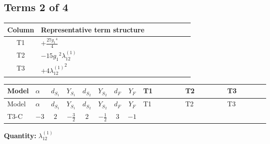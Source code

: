 \documentclass[8pt]{article}
\begin{document}
\begin{landscape}
\subsection*{Terms 2 of 4}
\begin{center}
\begin{tabular}{@{}c >{\raggedright\arraybackslash}p{0.82\linewidth}@{}}
\toprule
Column & Representative term structure \\
\midrule
T1 & \(\displaystyle +\frac{27 {g_1}^4}{4}\) \\
\midrule
T2 & \(\displaystyle -15 {g_1}^2 {\lambda_{12}^{(1)}}\) \\
\midrule
T3 & \(\displaystyle +4 {\lambda_{12}^{(1)}}^2\) \\
\midrule
\bottomrule
\end{tabular}
\end{center}
\smallskip
\tiny
\begin{longtable}{@{}llcccccc >{\raggedright\arraybackslash}p{0.21\linewidth} >{\raggedright\arraybackslash}p{0.21\linewidth} >{\raggedright\arraybackslash}p{0.21\linewidth}@{}}
\toprule
Model & $\alpha$ & $d_{S_1}$ & $Y_{S_1}$ & $d_{S_2}$ & $Y_{S_2}$ & $d_F$ & $Y_F$ & T1 & T2 & T3 \\
\midrule
\endfirsthead
\toprule
Model & $\alpha$ & $d_{S_1}$ & $Y_{S_1}$ & $d_{S_2}$ & $Y_{S_2}$ & $d_F$ & $Y_F$ & T1 & T2 & T3 \\
\midrule
\endhead
T3-C & $-3$ & $2$ & $-\frac{3}{2}$ & $2$ & $-\frac{1}{2}$ & $3$ & $-1$ & \scriptsize\adjustbox{max width=\linewidth}{$\begin{gathered} +\frac{27 {g_1}^4}{4}\end{gathered}$} & \scriptsize\adjustbox{max width=\linewidth}{$\begin{gathered} -15 {g_1}^2 {\lambda_{12}^{(1)}}\end{gathered}$} & \scriptsize\adjustbox{max width=\linewidth}{$\begin{gathered} +4 {\lambda_{12}^{(1)}}^2\end{gathered}$} \\
\midrule
\bottomrule
\end{longtable}
\clearpage
\noindent\textbf{Quantity: }$\lambda_{12}^{(1)}$\par\smallskip

\end{landscape}
\end{document}
